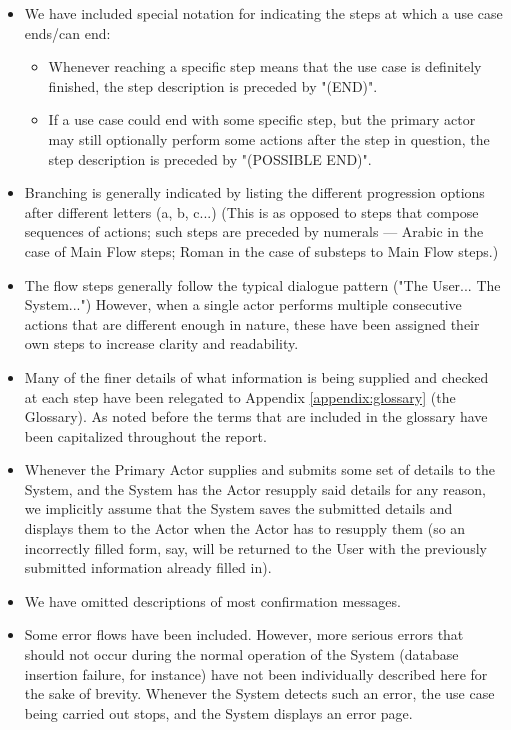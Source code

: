 \vspace{-0.3cm}
\begin{itemize}
    \item We have included special notation for indicating the steps at which a use case ends/can end:
    \begin{itemize}
        \item Whenever reaching a specific step means that the use case is definitely finished, the step description is preceded by "(END)".
        \item If a use case could end with some specific step, but the primary actor may still optionally perform some actions after the step in question, the step description is preceded by "(POSSIBLE END)".
    \end{itemize}  
    \item Branching is generally indicated by listing the different progression options after different letters (a, b, c...) (This is as opposed to steps that compose sequences of actions; such steps are preceded by numerals --- Arabic in the case of Main Flow steps; Roman in the case of substeps to Main Flow steps.)
    \item The flow steps generally follow the typical dialogue pattern ("The User... The System...") However, when a single actor performs multiple consecutive actions that are different enough in nature, these have been assigned their own steps to increase clarity and readability.
    \item Many of the finer details of what information is being supplied and checked at each step have been relegated to Appendix \ref{appendix:glossary} (the Glossary). As noted before the terms that are included in the glossary have been capitalized throughout the report.
    \item Whenever the Primary Actor supplies and submits some set of details to the System, and the System has the Actor resupply said details for any reason, we implicitly assume that the System saves the submitted details and displays them to the Actor when the Actor has to resupply them (so an incorrectly filled form, say, will be returned to the User with the previously submitted information already filled in).
    \item We have omitted descriptions of most confirmation messages.
    \item Some error flows have been included. However, more serious errors that should not occur during the normal operation of the System (database insertion failure, for instance) have not been individually described here for the sake of brevity. Whenever the System detects such an error, the use case being carried out stops, and the System displays an error page.
\end{itemize}

